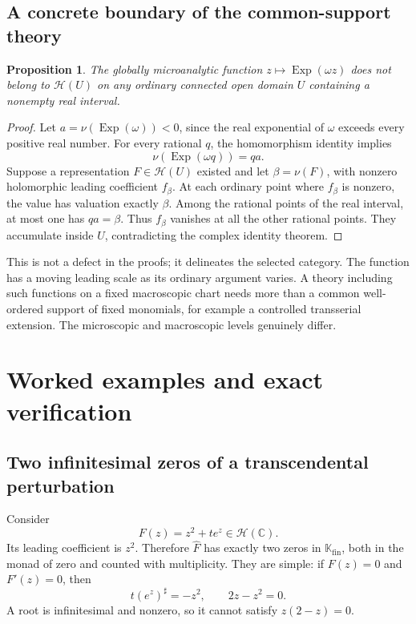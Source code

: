 \documentclass[11pt,oneside]{article}
\newtheorem{proposition}[theorem]{Proposition}
\theoremstyle{definition}\newtheorem{definition}[theorem]{Definition}
\newcommand{\K}{\mathbb K}
\newcommand{\C}{\mathbb C}
\newcommand{\HH}{\mathcal H}
\newcommand{\hatF}{\widehat F}
\newcommand{\val}{\nu}
\newcommand{\Fin}{\K_{\mathrm{fin}}}
\begin{document}
\subsection{A concrete boundary of the common-support theory}
\begin{proposition}\label{prop:movingscale}
The globally microanalytic function $z\mapsto\operatorname{Exp}(\omega z)$ does not belong to $\HH(U)$ on any ordinary connected open domain $U$ containing a nonempty real interval.
\end{proposition}
\begin{proof}
Let $a=\val(\operatorname{Exp}(\omega))<0$, since the real exponential of $\omega$ exceeds every positive real number. For every rational $q$, the homomorphism identity implies
\[
 \val(\operatorname{Exp}(\omega q))=qa.
\]
Suppose a representation $F\in\HH(U)$ existed and let $\beta=\val(F)$, with nonzero holomorphic leading coefficient $f_\beta$. At each ordinary point where $f_\beta$ is nonzero, the value has valuation exactly $\beta$. Among the rational points of the real interval, at most one has $qa=\beta$. Thus $f_\beta$ vanishes at all the other rational points. They accumulate inside $U$, contradicting the complex identity theorem.
\end{proof}
This is not a defect in the proofs; it delineates the selected category. The function has a moving leading scale as its ordinary argument varies. A theory including such functions on a fixed macroscopic chart needs more than a common well-ordered support of fixed monomials, for example a controlled transserial extension. The microscopic and macroscopic levels genuinely differ.

\section{Worked examples and exact verification}\label{sec:examples}
\subsection{Two infinitesimal zeros of a transcendental perturbation}
Consider
\begin{equation}\label{eq:exampleF}
 F(z)=z^2+t e^z\in\HH(\C).
\end{equation}
Its leading coefficient is $z^2$. Therefore $\hatF$ has exactly two zeros in $\Fin$, both in the monad of zero and counted with multiplicity. They are simple: if $F(z)=0$ and $F'(z)=0$, then
\[
 t(e^z)^\sharp=-z^2,\qquad 2z-z^2=0.
\]
A root is infinitesimal and nonzero, so it cannot satisfy $z(2-z)=0$.
\end{document}
